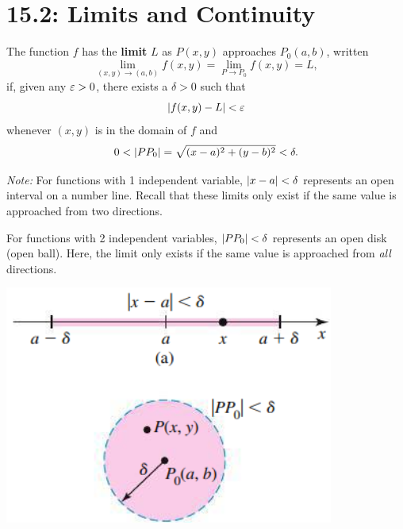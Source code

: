 \documentclass[mathNotesPreamble]{subfiles}
\begin{document}
\section{15.2: Limits and Continuity}

  \begin{defn*}
    The function $f$ has the \textbf{limit} $L$ as $P(x,y)$ approaches $P_0(a,b)$, written
      \[\lim_{(x,y)\to (a,b)} f(x,y)=\lim_{P\to P_0}f(x,y)=L,\]
    if, given any $\varepsilon>0$, there exists a $\delta>0$ such that
      \[{\left\vert f(x,y)-L\right\vert}<\varepsilon\]
    whenever $(x,y)$ is in the domain of $f$ and 
      \[0< {\left\vert PP_0\right\vert}=\sqrt{(x-a)^2+(y-b)^2}<\delta.\]
  \end{defn*}
  \textit{Note:} For functions with 1 independent variable, ${\left\vert x-a\right\vert}<\delta$ represents an open interval on a number line. Recall that these limits only exist if the same value is approached from two directions.
  
  For functions with 2 independent variables, ${\left\vert PP_0\right\vert}<\delta$ represents an open disk (open ball). Here, the limit only exists if the same value is approached from \textit{all} directions.

  \begin{center}
    \includegraphics[width=0.5\linewidth]{images/briggs_15_02/fig15_19}
  \end{center}
  \pagebreak


  \noindent
\end{document}
